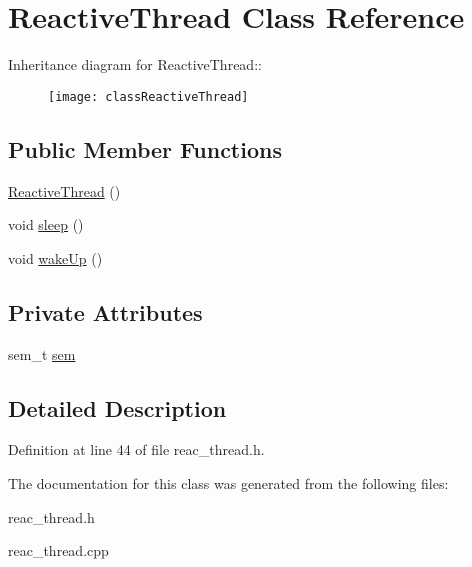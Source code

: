 \hypertarget{classReactiveThread}{
\section{Reactive\-Thread Class Reference}
\label{classReactiveThread}
}
Inheritance diagram for Reactive\-Thread::\begin{figure}[H]
\begin{center}
\leavevmode
\texttt{[image: classReactiveThread]}
\end{center}
\end{figure}
\subsection*{Public Member Functions}
\begin{CompactItemize}
\item 
\hypertarget{classReactiveThread_77381649429941c99a3e3d568113d6cf}{
\hyperlink{classReactiveThread_77381649429941c99a3e3d568113d6cf}{Reactive\-Thread} ()}
\label{classReactiveThread_77381649429941c99a3e3d568113d6cf}

\item 
\hypertarget{classReactiveThread_8263c2a32d8c99a49a05f1a7717d4262}{
void \hyperlink{classReactiveThread_8263c2a32d8c99a49a05f1a7717d4262}{sleep} ()}
\label{classReactiveThread_8263c2a32d8c99a49a05f1a7717d4262}

\item 
\hypertarget{classReactiveThread_a724a54575de10f09cc03ab7aa4e59ce}{
void \hyperlink{classReactiveThread_a724a54575de10f09cc03ab7aa4e59ce}{wake\-Up} ()}
\label{classReactiveThread_a724a54575de10f09cc03ab7aa4e59ce}

\end{CompactItemize}
\subsection*{Private Attributes}
\begin{CompactItemize}
\item 
\hypertarget{classReactiveThread_915e5a42dc8cb1bcf6738d5fe883a4e7}{
sem\_\-t \hyperlink{classReactiveThread_915e5a42dc8cb1bcf6738d5fe883a4e7}{sem}}
\label{classReactiveThread_915e5a42dc8cb1bcf6738d5fe883a4e7}

\end{CompactItemize}


\subsection{Detailed Description}




Definition at line 44 of file reac\_\-thread.h.

The documentation for this class was generated from the following files:\begin{CompactItemize}
\item 
reac\_\-thread.h\item 
reac\_\-thread.cpp\end{CompactItemize}
